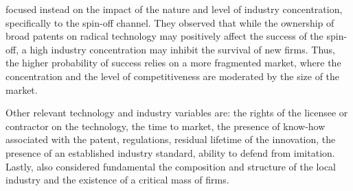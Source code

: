 \citet{Nerkar2003} focused instead on the impact of the nature and level of industry concentration, specifically to the spin-off channel. They observed that while the ownership of broad patents on radical technology may positively affect the success of the spin-off, a high industry concentration may inhibit the survival of new firms. Thus, the higher probability of success relies on a more fragmented market, where the concentration and the level of competitiveness are moderated by the size of the market. 

Other relevant technology and industry variables are: the rights of the licensee or contractor on the technology, the time to market, the presence of know-how associated with the patent, regulations, residual lifetime of the innovation, the presence of an established industry standard, ability to defend from imitation\citep{Balderi2010}. Lastly, \citet{Geuna2009} also considered fundamental the composition and structure of the local industry and the existence of a critical mass of firms.
